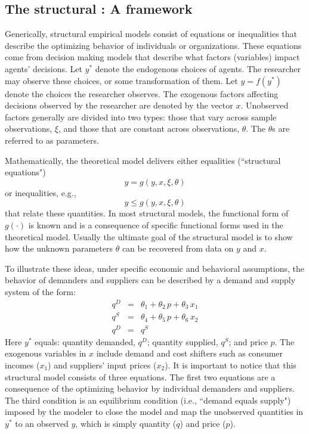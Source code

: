 \subsection{The structural : A framework}
Generically, structural empirical models consist of equations or inequalities that describe the optimizing behavior of individuals or organizations. 
These equations come from decision making models that describe what factors (variables) impact agents' decisions.
Let $y^*$ denote the endogenous choices of agents. 
The researcher may observe these choices, or some transformation of them.
Let $y=f(y^*)$ denote the choices the researcher observes. 
The exogenous factors affecting decisions observed by the researcher are denoted by the vector $x$. 
Unobserved factors generally are divided into two types: those that vary across sample observations, $\xi$, and those that are constant across observations, $\theta$. 
The $\theta$s are referred to as parameters.

Mathematically, the theoretical model delivers either equalities (``structural equations")
$$  y = g(y, x,\xi ,\theta)$$ 
or inequalities, e.g.,
$$  y \le g(y, x,\xi ,\theta)$$
that relate these quantities. 
In most structural models, the functional form of $g(\cdot)$ is known and is a consequence of specific functional forms used in the theoretical model. 
Usually the ultimate goal of the structural model is to show how the unknown parameters $\theta$ can be recovered from data on $y$ and $x$. 

To illustrate these ideas, under specific economic and behavioral
assumptions, the behavior of demanders and suppliers can be described by a demand and supply system of the form:
$$\begin{array}{lcl}
q^D & = & \theta_1 + \theta_2 \, p + \theta_3 \, x_1 \\[.5em]
q^S & = & \theta_4 + \theta_5\, p + \theta_6 \, x_2 \\[.5em]
q^D  & = & q^S 
\end{array}
$$
Here $y^*$ equals: quantity demanded, $q^D$;  quantity supplied, 
$q^S$; and price $p$.
The exogenous variables in $x$ include demand and cost shifters such as consumer incomes ($x_1$) and suppliers' input prices ($x_2$).
It is important to notice that this structural model consists of three equations. 
The first two equations are a consequence of the optimizing behavior by individual demanders and suppliers. 
The third condition is an equilibrium condition (i.e., ``demand equals supply") imposed by the modeler to close the model and map the unobserved quantities in $y^*$ to an observed $y$, which is simply quantity ($q$) and price ($p$).

